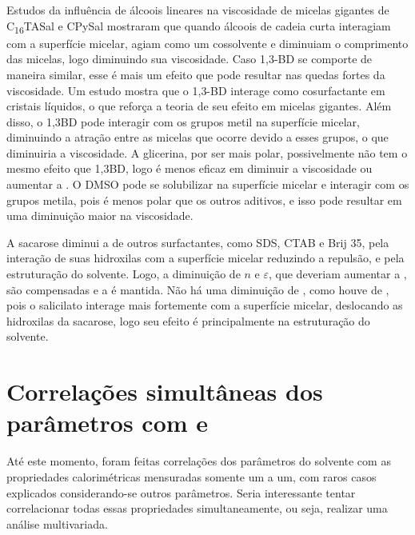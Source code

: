 		Estudos da influência de álcoois lineares na viscosidade de micelas gigantes de C\textsubscript{16}TASal e CPySal mostraram que quando álcoois de cadeia curta interagiam com a superfície micelar, agiam como um cossolvente e diminuiam o comprimento das micelas, logo diminuindo sua viscosidade. Caso 1,3-BD se comporte de maneira similar, esse é mais um efeito que pode resultar nas quedas fortes da viscosidade. Um estudo mostra que o 1,3-BD interage como cosurfactante em cristais líquidos, o que reforça a teoria de seu efeito em micelas gigantes. Além disso, o 1,3BD pode interagir com os grupos metil na superfície micelar, diminuindo a atração entre as micelas que ocorre devido a esses grupos, o que diminuiria a viscosidade. A glicerina, por ser mais polar, possivelmente não tem o mesmo efeito que 1,3BD, logo é menos eficaz em diminuir a viscosidade ou aumentar a \cmc. O DMSO pode se solubilizar na superfície micelar e interagir com os grupos metila, pois é menos polar que os outros aditivos, e isso pode resultar em uma diminuição maior na viscosidade. 
		
		
		A sacarose diminui a \cmc{} de outros surfactantes, como SDS, CTAB e Brij 35, pela interação de suas hidroxilas com a superfície micelar reduzindo a repulsão, e pela estruturação do solvente. Logo, a diminuição de \(n\) e \(\varepsilon\), que deveriam aumentar a \cwlm{}, são compensadas e a \cwlm{} é mantida. Não há uma diminuição de \cwlm, como houve de \cmc, pois o salicilato interage mais fortemente com a superfície micelar, deslocando as hidroxilas da sacarose, logo seu efeito é principalmente na estruturação do solvente.
		
		
		\section{Correlações simultâneas dos parâmetros com \cmc{} e \DHmic}
		
		Até este momento, foram feitas correlações dos parâmetros do solvente com as propriedades calorimétricas mensuradas somente um a um, com raros casos explicados considerando-se outros parâmetros. Seria interessante tentar correlacionar todas essas propriedades simultaneamente, ou seja, realizar uma análise multivariada.
		
